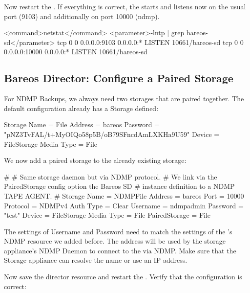 Now restart the \bareosSd.
If everything is correct, the \bareosSd starts and listens now on the usual port (9103) and additionally on port 10000 (ndmp).

\begin{commands}{}
<command>netstat</command> <parameter>-lntp | grep bareos-sd</parameter>
tcp        0      0 0.0.0.0:9103            0.0.0.0:*               LISTEN      10661/bareos-sd
tcp        0      0 0.0.0.0:10000           0.0.0.0:*               LISTEN      10661/bareos-sd
\end{commands}{}

\subsection{Bareos Director: Configure a Paired Storage}

For NDMP Backups, we always need two storages that are paired together.
The default configuration already has a Storage  defined:

\begin{bconfig}{}
Storage {
  Name = File
  Address = bareos
  Password = "pNZ3TvFAL/t+MyOIQo58p5B/oB79SFncdAmLXKHa9U59"
  Device = FileStorage
  Media Type = File
}
\end{bconfig}

We now add a paired storage to the already existing  storage:
\begin{bconfig}{}
#
# Same storage daemon but via NDMP protocol.
# We link via the PairedStorage config option the Bareos SD
# instance definition to a NDMP TAPE AGENT.
#
Storage {
  Name = NDMPFile
  Address = bareos
  Port = 10000
  Protocol = NDMPv4
  Auth Type = Clear
  Username = ndmpadmin
  Password = "test"
  Device = FileStorage
  Media Type = File
  PairedStorage = File
}
\end{bconfig}

The settings of Username and Password need to match the settings of the \bareosSd's NDMP resource we added before.
The address will be used by the storage appliance's NDMP Daemon to connect to the \bareosSd via NDMP.
Make sure that the Storage appliance can resolve the name or use an IP address.

Now save the director resource and restart the \bareosDir.
Verify that the configuration is correct:

